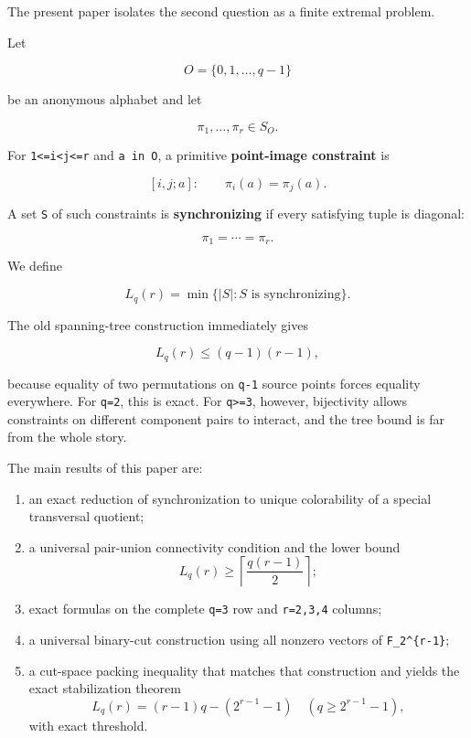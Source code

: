 The present paper isolates the second question as a finite extremal
problem.

Let

\[
O=\{0,1,\ldots,q-1\}
\]

be an anonymous alphabet and let

\[
\pi_1,\ldots,\pi_r\in S_O.
\]

For \texttt{1\textless{}=i\textless{}j\textless{}=r} and
\texttt{a\ in\ O}, a primitive \textbf{point-image constraint} is

\[
[i,j;a]:\qquad \pi_i(a)=\pi_j(a).
\tag{1}
\]

A set \texttt{S} of such constraints is \textbf{synchronizing} if every
satisfying tuple is diagonal:

\[
\pi_1=\cdots=\pi_r.
\tag{2}
\]

We define

\[
\boxed{
L_q(r)=\min\{|S|:S\text{ is synchronizing}\}.
}
\tag{3}
\]

The old spanning-tree construction immediately gives

\[
L_q(r)\le(q-1)(r-1),
\tag{4}
\]

because equality of two permutations on \texttt{q-1} source points
forces equality everywhere. For \texttt{q=2}, this is exact. For
\texttt{q\textgreater{}=3}, however, bijectivity allows constraints on
different component pairs to interact, and the tree bound is far from
the whole story.

The main results of this paper are:

\begin{enumerate}
\def\labelenumi{\arabic{enumi}.}
\tightlist
\item
  an exact reduction of synchronization to unique colorability of a
  special transversal quotient;
\item
  a universal pair-union connectivity condition and the lower bound \[
  L_q(r)\ge\left\lceil\frac{q(r-1)}2\right\rceil;
  \tag{5}
  \]
\item
  exact formulas on the complete \texttt{q=3} row and \texttt{r=2,3,4}
  columns;
\item
  a universal binary-cut construction using all nonzero vectors of
  \texttt{F\_2\^{}\{r-1\}};
\item
  a cut-space packing inequality that matches that construction and
  yields the exact stabilization theorem \[
  L_q(r)=(r-1)q-(2^{r-1}-1)
  \quad(q\ge2^{r-1}-1),
  \tag{6}
  \] with exact threshold.
\end{enumerate}

